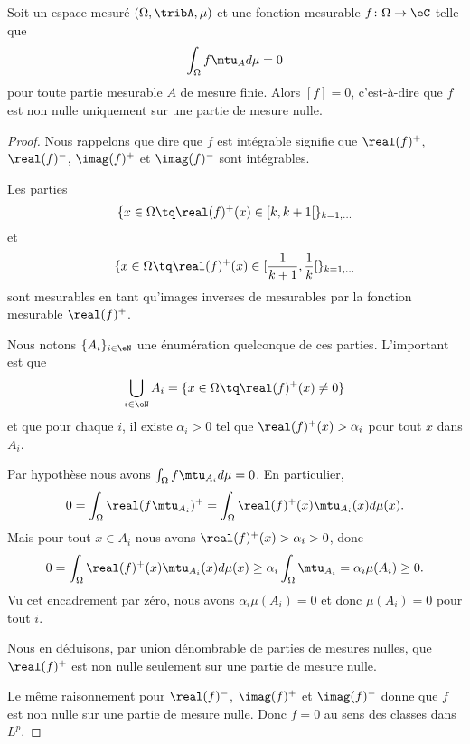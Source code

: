 \begin{proposition} \label{PropRERZooYcEchc}
	Soit un espace mesuré \( (\Omega,\tribA,\mu)\) et une fonction mesurable \( f\colon \Omega\to \eC \) telle que
	\begin{equation}
		\int_{\Omega}f\mtu_Ad\mu=0
	\end{equation}
	pour toute partie mesurable \( A\) de mesure finie. Alors \( [f]=0\), c'est-à-dire que \( f\) est non nulle uniquement sur une partie de mesure nulle.
\end{proposition}

\begin{proof}
	Nous rappelons que dire que \( f\) est intégrable signifie que \( \real(f)^+\), \( \real(f)^-\), \( \imag(f)^+\) et \( \imag(f)^-\) sont intégrables.

	Les parties
	\begin{equation}
		\{ x\in \Omega \tq \real(f)^+(x)\in \mathopen[ k , k+1 \mathclose[ \}_{k=1,\ldots}
	\end{equation}
	et
	\begin{equation}
		\{ x\in \Omega \tq \real(f)^+(x)\in \mathopen[ \frac{1}{ k+1 } , \frac{1}{ k } \mathclose[ \}_{k=1,\ldots}
	\end{equation}
	sont mesurables en tant qu'images inverses de mesurables par la fonction mesurable \( \real(f)^+\).

	Nous notons \( \{ A_i \}_{i\in \eN}\) une énumération quelconque de ces parties. L'important est que
	\begin{equation}
		\bigcup_{i\in \eN}A_i=\{ x\in \Omega\tq \real(f)^+(x)\neq 0 \}
	\end{equation}
	et que pour chaque \( i\), il existe \( \alpha_i>0\) tel que \( \real(f)^+(x)>\alpha_i\) pour tout \( x\) dans \( A_i\).

	Par hypothèse nous avons \( \int_{\Omega}f\mtu_{A_i}d\mu=0\). En particulier,
	\begin{equation}
		0=\int_{\Omega}\real(f\mtu_{A_i})^+=\int_{\Omega}\real(f)^+(x)\mtu_{A_i}(x)d\mu(x).
	\end{equation}
	Mais pour tout \( x\in A_i\) nous avons \( \real(f)^+(x)>\alpha_i>0\), donc
	\begin{equation}
		0=\int_{\Omega}\real(f)^+(x)\mtu_{A_i}(x)d\mu(x)\geq \alpha_i\int_{\Omega}\mtu_{A_i}=\alpha_i\mu(A_i)\geq 0.
	\end{equation}
	Vu cet encadrement par zéro, nous avons \( \alpha_i\mu(A_i)=0\) et donc \( \mu(A_i)=0\) pour tout \( i\).

	Nous en déduisons, par union dénombrable de parties de mesures nulles, que \( \real(f)^+\) est non nulle seulement sur une partie de mesure nulle.

	Le même raisonnement pour \( \real(f)^-\), \( \imag(f)^+\) et \( \imag(f)^-\) donne que \( f\) est non nulle sur une partie de mesure nulle. Donc \( f=0\) au sens des classes dans \( L^p\).
\end{proof}
